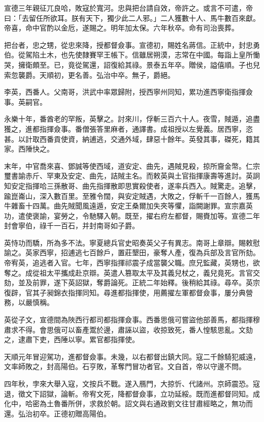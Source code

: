 \begin{pinyinscope}
宣德三年親征兀良哈，敗寇於寬河。忠與把台請自效，帝許之。或言不可遣，帝曰：「去留任所欲耳。朕有天下，獨少此二人邪。」二人獲數十人、馬牛數百來獻。帝喜，命中官酌以金卮，遂賜之。明年加太保。六年秋卒。命有司治喪葬。

把台者，忠之甥，從忠來降，授都督僉事。宣德初，賜姓名蔣信。正統中，封忠勇伯。從駕陷土木，也先使隸賽罕王帳下。信雖居朔漠，志常在中國。每詣上皇所慟哭，擁衛頗至。已，竟從駕還，詔復給其祿。景泰五年卒。贈侯，謚僖順。子也兒索忽襲爵。天順初，更名善。弘治中卒。無子，爵絕。

李英，西番人。父南哥，洪武中率眾歸附，授西寧州同知，累功進西寧衛指揮僉事。英嗣官。

永樂十年，番酋老的罕叛，英擊之。討來川，俘斬三百六十人。夜雪，賊遁，追盡獲之，進都指揮僉事。番僧張答里麻者，通譯書。成祖授以左覺義。居西寧，恣甚。以計取西番貢使資，納逋逃，交通外域，肆惡十餘年。英發其事，磔死，籍其家。西陲快之。

末年，中官喬來喜、鄧誠等使西域，道安定、曲先，遇賊見殺，掠所齎金幣。仁宗璽書諭赤斤、罕東及安定、曲先，詰賊主名。而敕英與土官指揮康壽等進討。英詗知安定指揮哈三孫散哥、曲先指揮散即思實殺使者，遂率兵西入。賊驚走。追擊，踰崑崙山，深入數百里。至雅令闊，與安定賊遇，大敗之，俘斬千一百餘人，獲馬牛雜畜十四萬。曲先賊聞風遠遁，安定王桑爾加失夾等懼，詣闕謝罪。宣宗嘉英功，遣使褒諭，宴勞之，令馳驛入朝。既至，擢右府左都督，賜賚加等。宣德二年封會寧伯，祿千一百石，并封南哥如子爵。

英恃功而驕，所為多不法。寧夏總兵官史昭奏英父子有異志。南哥上章辯。賜敕慰諭之。英家西寧，招逋逃七百餘戶，置莊墾田，豪奪人產，復為兵部及言官所劾。帝宥英，追逃者入官。七年，西寧指揮祁震子成當襲父職。庶兄監藏，英甥也，欲奪之。成從祖太平攜成赴京辯。英遣人篡取太平及其義兒杖之，義兒竟死。言官交劾，並及前罪，遂下英詔獄，奪爵論死。正統二年始釋。後稍給其祿。尋卒。英宗復辟，官其子昶錦衣指揮同知。尋進都指揮使，用薦擢左軍都督僉事，屢分典營務，以嚴慎稱。

英從子文，宣德間為陜西行都司都指揮僉事。西番思俄可嘗盜他部善馬，都指揮穆肅求不得。會思俄可以畜產鬻於邊，肅誣以盜，收掠致死，番人惶駭思亂。文劾之，逮肅下吏，西陲以寧。累官都指揮使。

天順元年冒迎駕功，進都督僉事。未幾，以右都督出鎮大同。寇二千餘騎犯威遠，文率師敗之，封高陽伯。石亨敗，革奪門冒功者官。文自首，帝以守邊不問。

四年秋，孛來大舉入寇，文按兵不戰。遂入鴈門，大掠忻、代諸州。京師震恐。寇退，徵文下詔獄，論斬。帝宥文死，降都督僉事，立功延綏。既而進都督同知。成化中，哈密為土魯番所併，求救於朝。詔文與右通政劉文往甘肅經略之，無功而還。弘治初卒。正德初贈高陽伯。


\end{pinyinscope}

